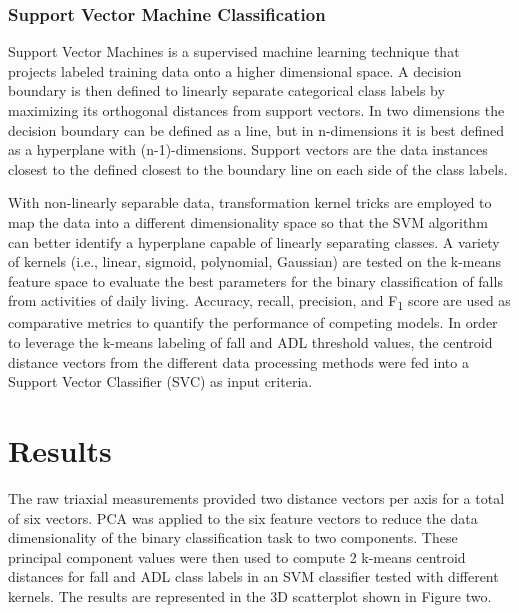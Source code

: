 \documentclass{llncs}
\begin{document}
\subsubsection{Support Vector Machine Classification} 
Support Vector Machines is a supervised machine learning technique that projects labeled training data onto a higher dimensional space. A decision boundary is then defined to linearly separate categorical class labels by maximizing its orthogonal distances from support vectors. In two dimensions the decision boundary can be defined as a line, but in n-dimensions it is best defined as a hyperplane with (n-1)-dimensions. Support vectors are the data instances closest to the defined closest to the boundary line on each side of the class labels. 

	With non-linearly separable data, transformation kernel tricks are employed to map the data into a different dimensionality space so that the SVM algorithm can better identify a hyperplane capable of linearly separating classes. A variety of kernels (i.e., linear, sigmoid, polynomial, Gaussian) are tested on the k-means feature space to evaluate the best parameters for the binary classification of falls from activities of daily living. Accuracy, recall, precision, and F\textsubscript{1} score are used as comparative metrics to quantify the performance of competing models. In order to leverage the k-means labeling of fall and ADL threshold values, the centroid distance vectors from the different data processing methods were fed into a Support Vector Classifier (SVC) as input criteria.


    
\section{Results}

The raw triaxial measurements provided two distance vectors per axis for a total of six vectors. PCA was applied to the six feature vectors to reduce the data dimensionality of the binary classification task to two components. These principal component values were then used to compute 2 k-means centroid distances for fall and ADL class labels in an SVM classifier tested with different kernels. The results are represented in the 3D scatterplot shown in Figure two.
\end{document}
